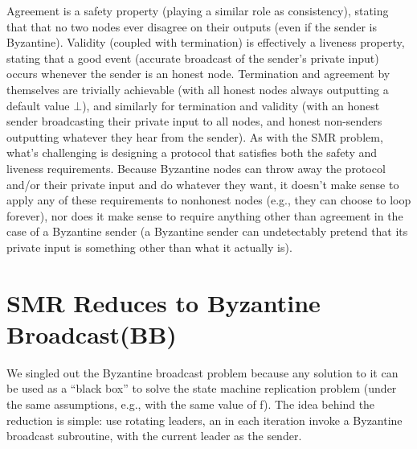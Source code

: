 
Agreement is a safety property (playing a similar role as consistency), stating that that no
two nodes ever disagree on their outputs (even if the sender is Byzantine). Validity (coupled with termination) is effectively a liveness property, stating that a good event (accurate
broadcast of the sender’s private input) occurs whenever the sender is an honest node. Termination and agreement by themselves are trivially achievable (with all honest nodes always
outputting a default value $\bot$), and similarly for termination and validity (with an honest
sender broadcasting their private input to all nodes, and honest non-senders outputting
whatever they hear from the sender). As with the SMR problem, what’s challenging is
designing a protocol that satisfies both the safety and liveness requirements.
Because Byzantine nodes can throw away the protocol and/or their private input and
do whatever they want, it doesn’t make sense to apply any of these requirements to nonhonest nodes (e.g., they can choose to loop forever), nor does it make sense to require
anything other than agreement in the case of a Byzantine sender (a Byzantine sender can
undetectably pretend that its private input is something other than what it actually is).

\section{SMR Reduces to Byzantine Broadcast(BB)}
We singled out the Byzantine broadcast problem because any solution to it can be used as
a “black box” to solve the state machine replication problem (under the same assumptions,
e.g., with the same value of f). The idea behind the reduction is simple: use rotating leaders,
an in each iteration invoke a Byzantine broadcast subroutine, with the current leader as the
sender.

